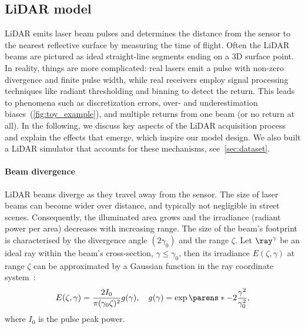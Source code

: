 \subsection{LiDAR model}
\label{sec:lidar_model}

LiDAR emits laser beam pulses and determines the distance from the sensor to the nearest reflective surface by measuring the time of flight. 
Often the LiDAR beams are pictured as ideal straight-line segments ending on a 3D surface point. In reality, things are more complicated: real lasers emit a pulse with non-zero divergence and finite pulse width, while real receivers employ signal processing techniques like radiant thresholding and binning to detect the return. This leads to phenomena such as discretization errors, over- and underestimation biases~(\cf \cref{fig:toy_example}), and multiple returns from one beam (or no return at all). 
In the following, we discuss key aspects of the LiDAR acquisition process and explain the effects that emerge, which inspire our model design. We also built a LiDAR simulator that accounts for these mechanisms, see~\cref{sec:dataset}.


\paragraph{Beam divergence}
LiDAR beams diverge as they travel away from the sensor. The size of laser beams can become wider over distance, and typically not negligible in street scenes. Consequently, the illuminated area grows and the irradiance (radiant power per area) decreases with increasing range.
The size of the beam's footprint is characterised by the divergence angle $(2\gamma_0)$ and the range $\zeta$. Let $\ray^{\gamma}$ be an ideal ray within the beam's cross-section, $\gamma \leq \gamma_0$, then its irradiance $E(\zeta, \gamma)$ at range $\zeta$ can be approximated by a Gaussian function in the ray coordinate system~\cite{wagner2006gaussian}:
\begin{equation}
    E(\zeta, \gamma) =\frac{2I_0}{\pi (\gamma_0 \zeta)^2} g(\gamma), \quad g(\gamma) = \exp\parens*{-2 \frac{\gamma^2}{\gamma_0^2}},
\end{equation}
where $I_0$ is the pulse peak power. %


